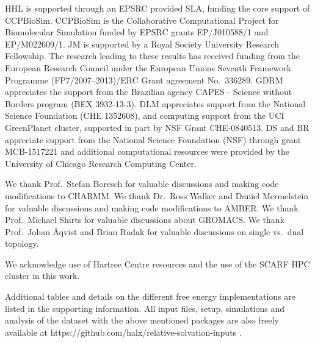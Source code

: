 \documentclass[journal=jctcce,manuscript=article]{achemso}
\begin{document}
\begin{acknowledgement}
  HHL is supported through an EPSRC provided SLA, funding the core
  support of CCPBioSim.  CCPBioSim is the Collaborative Computational
  Project for Biomolecular Simulation funded by EPSRC grants
  EP/J010588/1 and EP/M022609/1.  JM is supported by a Royal Society
  University Research Fellowship.  The research leading to these
  results has received funding from the European Research Council
  under the European Unions Seventh Framework Programme
  (FP7/2007--2013)/ERC Grant agreement No.\ 336289.  GDRM appreciates
  the support from the Brazilian agency CAPES - Science without
  Borders program (BEX 3932-13-3).  DLM appreciates support from the
  National Science Foundation (CHE 1352608), and computing support
  from the UCI GreenPlanet cluster, supported in part by NSF Grant
  CHE-0840513. DS and BR appreciate support from the National Science Foundation (NSF) through grant MCB-1517221 and additional computational resources were provided by the University of Chicago Research Computing Center.


  We thank Prof.\ Stefan Boresch for valuable discussions and making code
  modifications to CHARMM.  We thank Dr.\ Ross Walker and Daniel Mermelstein
  for valuable discussions and making code modifications to AMBER.  We thank
  Prof.\ Michael Shirts for valuable discussions about GROMACS.  We thank
  Prof.\ Johan \AA{}qvist and Brian Radak for valuable discussions on single
  vs.\ dual topology.

  We acknowledge use of Hartree Centre resources and the use of the
  SCARF HPC cluster in this work.
\end{acknowledgement}

\begin{suppinfo}
Additional tables and details on the different free energy
implementations are listed in the supporting information.  All input
files, setup, simulations and analysis of the dataset with the above
mentioned packages are also freely available at
https://github.com/halx/relative-solvation-inputs .

\end{suppinfo}


\end{document}
